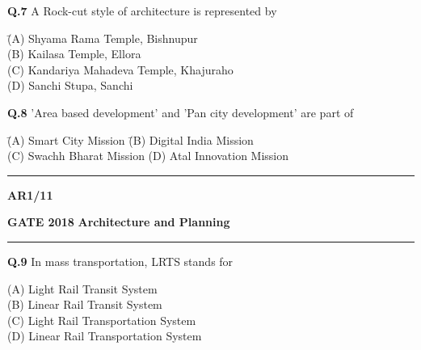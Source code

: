 \documentclass[journal,12pt,onecolumn]{IEEEtran}
\theoremstyle{remark}
\begin{document}
\vspace{1.5em}

\noindent\textbf{Q.7} \hspace{0.5em} A Rock-cut style of architecture is represented by

\vspace{0.5em}

\begin{tabbing}
\hspace{2cm} \= (A) Shyama Rama Temple, Bishnupur \\
\> (B) Kailasa Temple, Ellora \\
\> (C) Kandariya Mahadeva Temple, Khajuraho \\
\> (D) Sanchi Stupa, Sanchi
\end{tabbing}

\vspace{1.5em}

\noindent\textbf{Q.8} \hspace{0.5em} 'Area based development' and 'Pan city development' are part of

\vspace{0.5em}

\begin{tabbing}
\hspace{2cm} \= (A) Smart City Mission \hspace{2cm} \= (B) Digital India Mission \\
\> (C) Swachh Bharat Mission \> (D) Atal Innovation Mission
\end{tabbing}

\vspace{1cm}

\vfill
\noindent\rule{\textwidth}{0.4pt} \textbf{AR}\hfill \textbf{1/11}

\vspace{0.006cm}

 \newpage
 
\noindent
\textbf{GATE 2018} \hfill \textbf{Architecture and Planning}
\vspace{0.0012cm} \hrule
 
\vspace{1cm}
\noindent \textbf{Q.9} \hspace{0.6cm} In mass transportation, LRTS stands for

\begin{flushleft}
\hspace{1.2cm}  (A) Light Rail Transit System\\
\hspace{1.2cm} (B) Linear Rail Transit System\\
\hspace{1.2cm} (C) Light Rail Transportation System\\
\hspace{1.2cm} (D) Linear Rail Transportation System
\end{flushleft}
\end{document}
